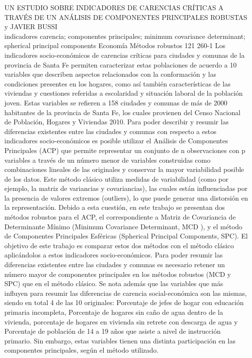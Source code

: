\A
{UN ESTUDIO SOBRE INDICADORES DE CARENCIAS CRÍTICAS A TRAVÉS DE UN ANÁLISIS DE COMPONENTES PRINCIPALES ROBUSTAS}
{ y JAVIER BUSSI}
{
\\}
{indicadores carencia; componentes principales; minimum covariance determinant; spherical principal components} 
 {Economía} 
 {Métodos robustos} 
 {121} 
 {260-1}
{Los indicadores socio-económicos de carencias críticas para ciudades y comunas de la provincia de Santa Fe permiten caracterizar estas poblaciones de acuerdo a 10 variables que describen aspectos relacionados con la conformación y las condiciones presentes en los hogares, como así también características de las viviendas y cuestiones referidas a escolaridad y situación laboral de la población joven. Estas variables se refieren a 158 ciudades y comunas de más de 2000 habitantes de la provincia de Santa Fe, los cuales provienen del Censo Nacional de Población, Hogares y Viviendas 2010. Para poder describir y resumir las diferencias existentes entre las ciudades y comunas con respecto a estos indicadores socio-económicos es posible utilizar el Análisis de Componentes Principales (ACP) que permite representar un conjunto de n observaciones con p variables a través de un número menor de variables construidas como combinaciones lineales de las originales y conservar la mayor variabilidad posible de los datos. Este método clásico utiliza medidas de variabilidad (como por ejemplo, la matriz de variancias y covariancias), las cuales están influenciadas por la presencia de valores extremos (outliers), lo que puede generar una distorsión en la representación. Debido a esta cuestión, en este trabajo se presentan dos métodos robustos para el ACP, el correspondiente a Matriz de Covariancia de Determinante Mínimo (Minimum Covariance Determinant, MCD ), y el método de Componentes Principales Esféricas (Spherical Principal Components, SPC). El objetivo de este trabajo es comparar estos dos métodos con el método clásico aplicándolos a estos indicadores socio-económicos. Para poder resumir las diferencias existentes entre las ciudades y comunas es necesario retener un número mayor de componentes principales en los métodos robustos (MCD y SPC) que en el método clásico. Se nota además que las variables que más influyen para resumir las diferencias de carencia social-económica son las mismas, siendo en total 4 de las 10 originales: Porcentaje de jefes de hogar con educación primaria incompleta, Porcentaje de hogares sin caño de agua dentro de la vivienda, porcentaje de hogares en vivienda sin retrete con descarga de agua y Porcentaje de población de 14 a 19 años que asiste a nivel de instrucción primario. Sin embargo, estas variables tienen una distinta participación en las componentes principales, según el método utilizado.}
